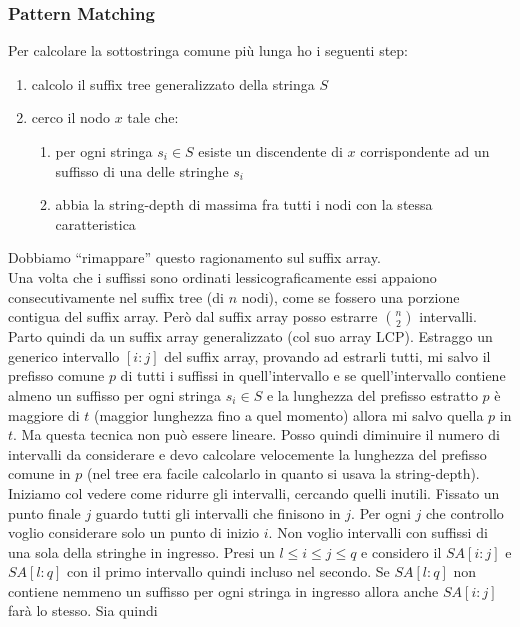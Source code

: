 \documentclass[a4paper,12pt, oneside]{book}
\begin{document}
\subsubsection{Pattern Matching}
Per calcolare la sottostringa comune più lunga ho i seguenti step:
\begin{enumerate}
  \item calcolo il suffix tree generalizzato della stringa $S$
  \item cerco il nodo $x$ tale che:
  \begin{enumerate}
    \item per ogni stringa $s_i \in S$ esiste un discendente di $x$
    corrispondente ad un suffisso di una delle stringhe $s_i$
    \item abbia la string-depth di massima fra tutti i nodi con la
    stessa caratteristica
  \end{enumerate}
\end{enumerate}
Dobbiamo ``rimappare'' questo ragionamento sul suffix array.\\
Una volta che i suffissi sono ordinati lessicograficamente essi
appaiono consecutivamente nel suffix tree (di $n$ nodi), come se
fossero una porzione contigua del suffix array. Però dal suffix array
posso estrarre $n\choose 2$ intervalli.\\
Parto quindi da un suffix array generalizzato (col suo array
LCP). Estraggo un generico intervallo $[i:j]$ del suffix array,
provando ad estrarli tutti, mi salvo il prefisso comune $p$ di tutti i
suffissi in quell'intervallo e se quell'intervallo contiene almeno un
suffisso per ogni stringa $s_i\in S$ e la lunghezza del prefisso
estratto $p$ è maggiore di $t$ (maggior lunghezza fino a quel momento)
allora mi salvo quella $p$ in $t$. Ma questa tecnica non può essere
lineare. Posso quindi diminuire il numero di intervalli da considerare
e devo calcolare velocemente la lunghezza del prefisso comune in $p$
(nel tree era facile calcolarlo in quanto si usava la string-depth).\\
Iniziamo col vedere come ridurre gli intervalli, cercando quelli
inutili. Fissato un punto finale $j$ guardo tutti gli intervalli che
finisono in $j$. Per ogni $j$ che controllo voglio considerare solo un
punto di inizio $i$. Non voglio intervalli con suffissi di una sola
della stringhe in ingresso. Presi un $l\leq i \leq j \leq q$ e
considero il $SA[i:j]$ e $SA[l:q]$ con il primo intervallo quindi
incluso nel secondo. Se $SA[l:q]$ non contiene nemmeno un suffisso per ogni
stringa in ingresso allora anche $SA[i:j]$ farà lo stesso. Sia quindi
\end{document}
